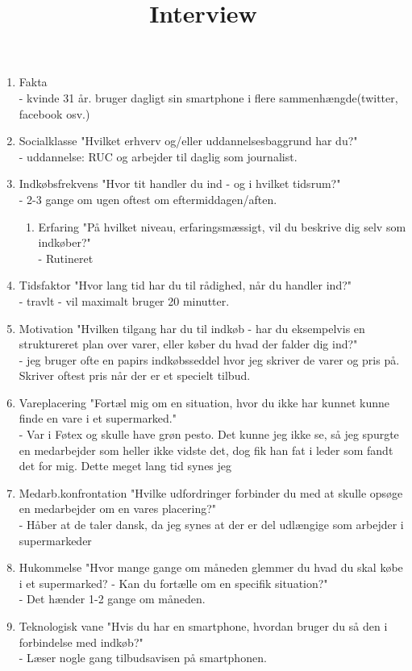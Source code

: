 \documentclass[a4paper,11pt]{report}
\title{Interview}
\begin{document}
\maketitle
 
\begin{enumerate}
\item Fakta\\
  - kvinde 31 år. bruger dagligt sin smartphone i flere sammenhængde(twitter, facebook osv.)
\item Socialklasse "Hvilket erhverv og/eller uddannelsesbaggrund har du?"\\
  - uddannelse: RUC og arbejder til daglig som journalist.
\item Indkøbsfrekvens "Hvor tit handler du ind - og i hvilket tidsrum?"\\
  - 2-3 gange om ugen oftest om eftermiddagen/aften. 
\begin{enumerate}
\item Erfaring	"På hvilket niveau, erfaringsmæssigt, vil du beskrive dig selv som indkøber?"\\
  - Rutineret
\end{enumerate}

\item Tidsfaktor "Hvor lang tid har du til rådighed, når du handler ind?"\\
  - travlt - vil maximalt bruger 20 minutter.
\item Motivation "Hvilken tilgang har du til indkøb - har du eksempelvis en struktureret plan over varer, eller køber du hvad der falder dig ind?"\\
  - jeg bruger ofte en papirs indkøbsseddel hvor jeg skriver de varer og pris på. Skriver oftest pris når der er et specielt tilbud.
\item  Vareplacering "Fortæl mig om en situation, hvor du ikke har kunnet kunne finde en vare i et supermarked."\\
  - Var i Føtex og skulle have grøn pesto. Det kunne jeg ikke se, så jeg spurgte en medarbejder som heller ikke vidste det, 
    dog fik han fat i leder som fandt det for mig. Dette meget lang tid synes jeg
\item Medarb.konfrontation "Hvilke udfordringer forbinder du med at skulle opsøge en medarbejder om en vares placering?"\\
  - Håber at de taler dansk, da jeg synes at der er del udlængige som arbejder i supermarkeder
\item Hukommelse "Hvor mange gange om måneden glemmer du hvad du skal købe i et supermarked? - Kan du fortælle om en specifik situation?"\\
  - Det hænder 1-2 gange om måneden.
\item Teknologisk vane "Hvis du har en smartphone, hvordan bruger du så den i forbindelse med indkøb?"\\
  - Læser nogle gang tilbudsavisen på smartphonen.


\end{enumerate}
\end{document}
